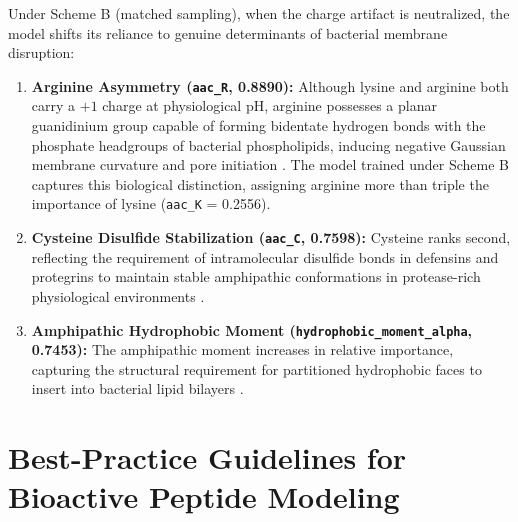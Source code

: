\documentclass[11pt,a4paper]{article}
\begin{document}
Under Scheme B (matched sampling), when the charge artifact is neutralized, the model shifts its reliance to genuine determinants of bacterial membrane disruption:
\begin{enumerate}
    \item \textbf{Arginine Asymmetry (\texttt{aac\_R}, 0.8890):} Although lysine and arginine both carry a $+1$ charge at physiological pH, arginine possesses a planar guanidinium group capable of forming bidentate hydrogen bonds with the phosphate headgroups of bacterial phospholipids, inducing negative Gaussian membrane curvature and pore initiation \cite{rothbard2004role, schmidt2013antimicrobial}. The model trained under Scheme B captures this biological distinction, assigning arginine more than triple the importance of lysine (\texttt{aac\_K} = 0.2556).
    \item \textbf{Cysteine Disulfide Stabilization (\texttt{aac\_C}, 0.7598):} Cysteine ranks second, reflecting the requirement of intramolecular disulfide bonds in defensins and protegrins to maintain stable amphipathic conformations in protease-rich physiological environments \cite{ganz2003defensins, mahlapuu2016antimicrobial}.
    \item \textbf{Amphipathic Hydrophobic Moment (\texttt{hydrophobic\_moment\_alpha}, 0.7453):} The amphipathic moment increases in relative importance, capturing the structural requirement for partitioned hydrophobic faces to insert into bacterial lipid bilayers \cite{eisenberg1984analysis, wimley2010describing, matsuzaki2009control}.
\end{enumerate}

\section{Best-Practice Guidelines for Bioactive Peptide Modeling}
\end{document}
